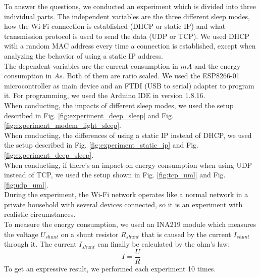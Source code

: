 To answer the questions, we conducted an experiment which is divided into three individual parts.
The independent variables are the three different sleep modes, how the Wi-Fi connection is established (DHCP or static IP) and what transmission protocol is used to send the data (UDP or TCP).
We used DHCP with a random MAC address every time a connection is established, except when analyzing the behavior of using a static IP address.\\
The dependent variables are the current consumption in $mA$ and the energy consumption in $As$. Both of them are ratio scaled.
We used the ESP8266-01 microcontroller as main device and an FTDI (USB to serial) adapter to program it. 
For programming, we used the Arduino IDE in version 1.8.16.\\
When conducting, the impacts of different sleep modes, we used the setup described in Fig. \ref{fig:experiment_deep_sleep} and Fig. \ref{fig:experiment_modem_light_sleep}.\\
When conducting, the differences of using a static IP instead of DHCP, we used the setup described in Fig. \ref{fig:experiment_static_ip} and Fig. \ref{fig:experiment_deep_sleep}.\\
When conducting, if there's an impact on energy consumption when using UDP instead of TCP, we used the setup shown in Fig. \ref{fig:tcp_uml} and Fig. \ref{fig:udp_uml}.\\
During the experiment, the Wi-Fi network operates like a normal network in a private household with several devices connected, so it is an experiment with realistic circumstances.\\

To measure the energy consumption, we used an INA219 module which measures the voltage $U_{shunt}$ on a shunt resistor $R_{shunt}$ that is caused by the current $I_{shunt}$ through it.
The current $I_{shunt}$ can finally be calculated by the ohm's law:
\begin{equation*}
    I = \frac{U}{R}
\end{equation*}
To get an expressive result, we performed each experiment 10 times.





